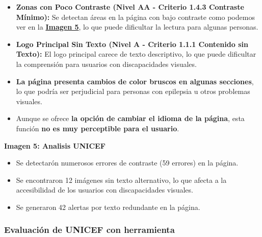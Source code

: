 \documentclass[a4paper]{article}
\newcommand{\erroresUnicef}{errorUnicef.png}
\begin{document}
    \begin{itemize}
        \item \textbf{Zonas con Poco Contraste (Nivel AA - Criterio 1.4.3 Contraste Mínimo):} Se detectan áreas en la página con bajo contraste como podemos ver en la \textbf{\hyperref[fig:imagen-analsis-unicef]{Imagen 5}}, lo que puede dificultar la lectura para algunas personas.

        \item \textbf{Logo Principal Sin Texto (Nivel A - Criterio 1.1.1 Contenido sin Texto):} El logo principal carece de texto descriptivo, lo que puede dificultar la comprensión para usuarios con discapacidades visuales.

        \item \textbf{La página presenta cambios de color bruscos en algunas secciones}, lo que podría ser perjudicial para personas con epilepsia u otros problemas visuales.
        
        \item Aunque se ofrece \textbf{la opción de cambiar el idioma de la página}, esta función \textbf{no es muy perceptible para el usuario}.
    \end{itemize}
    
    \begin{center}
        \vspace{0.2cm}\par
        \textbf{Imagen 5: Analisis UNICEF\label{fig:imagen-analsis-unicef}}
    \end{center}
    
    \begin{itemize}
        \item Se detectarón numerosos errores de contraste (59 errores) en la página.
        \item Se encontraron 12 imágenes sin texto alternativo, lo que afecta a la accesibilidad de los usuarios con discapacidades visuales.
        \item Se generaron 42 alertas por texto redundante en la página.
    \end{itemize}


    \subsubsection{Evaluación de UNICEF con herramienta}
    
\end{document}
